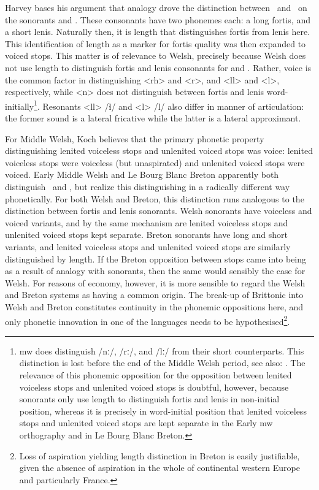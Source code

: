 Harvey bases his argument that analogy drove the distinction between \lT\ and \xD\ on the sonorants and . These consonants have two phonemes each: a long fortis, and a short lenis. Naturally then, it is length that distinguishes fortis from lenis here. This identification of length as a marker for fortis quality was then expanded to voiced stops. This matter is of relevance to Welsh, precisely because Welsh does not use length to distinguish fortis and lenis consonants for  and . Rather, voice is the common factor in distinguishing <rh> and <r>, and <ll> and <l>, respectively, while <n> does not distinguish between fortis and lenis word-initially\footnote{\gls{mw} does distinguish /nː/, /rː/, and /lː/ from their short counterparts. This distinction is lost before the end of the Middle Welsh period, see also: \textcite[127--128]{schumacher_mittel-_2011}. The relevance of this phonemic opposition for the opposition between lenited voiceless stops and unlenited voiced stops is doubtful, however, because sonorants only use length to distinguish fortis and lenis in non-initial position, whereas it is precisely in word-initial position that lenited voiceless stops and unlenited voiced stops are kept separate in the Early \gls{mw} orthography and in Le Bourg Blanc Breton.}. Resonants  <ll> /ɬ/ and <l> /l/ also differ in manner of articulation: the former sound is a lateral fricative while the latter is a lateral approximant. 

For Middle Welsh, Koch \parencite*{koch_*cothairche_1990} believes that the primary phonetic property distinguishing lenited voiceless stops and unlenited voiced stops was voice: lenited voiceless stops were voiceless (but unaspirated) and unlenited voiced stops were voiced. Early Middle Welsh and Le Bourg Blanc Breton apparently both distinguish \lT\ and \xD, but realize this distinguishing in a radically different way phonetically. For both Welsh and Breton, this distinction runs analogous to the distinction between fortis and lenis sonorants. Welsh sonorants have voiceless and voiced variants, and by the same mechanism are lenited voiceless stops and unlenited voiced stops kept separate. Breton sonorants have long and short variants, and lenited voiceless stops and unlenited voiced stops are similarly distinguished by length. If the Breton opposition between stops came into being as a result of analogy with sonorants, then the same would sensibly the case for Welsh. For reasons of economy, however, it is more sensible to regard the Welsh and Breton systems as having a common origin. The break-up of Brittonic into Welsh and Breton constitutes continuity in the phonemic oppositions here, and only phonetic innovation in one of the languages needs to be hypothesised\footnote{Loss of aspiration yielding length distinction in Breton is easily justifiable, given the absence of aspiration in the whole of continental western Europe and particularly France.}. 

